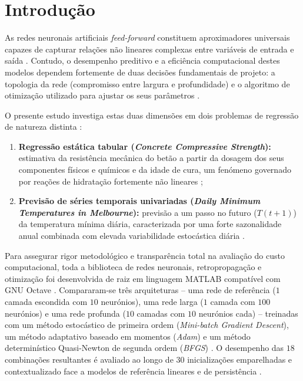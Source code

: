\documentclass[conference]{IEEEtran}
\begin{document}
\section{Introdução}

As redes neuronais artificiais \textit{feed-forward} constituem aproximadores universais capazes de capturar relações não lineares complexas entre variáveis de entrada e saída \cite{b6}. Contudo, o desempenho preditivo e a eficiência computacional destes modelos dependem fortemente de duas decisões fundamentais de projeto: a topologia da rede (compromisso entre largura e profundidade) e o algoritmo de otimização utilizado para ajustar os seus parâmetros \cite{b1, b7}.

O presente estudo investiga estas duas dimensões em dois problemas de regressão de natureza distinta \cite{b1}:
\begin{enumerate}
    \item \textbf{Regressão estática tabular (\textit{Concrete Compressive Strength}):} estimativa da resistência mecânica do betão a partir da dosagem dos seus componentes físicos e químicos e da idade de cura, um fenómeno governado por reações de hidratação fortemente não lineares \cite{b2, b3, b11};
    \item \textbf{Previsão de séries temporais univariadas (\textit{Daily Minimum Temperatures in Melbourne}):} previsão a um passo no futuro ($T(t+1)$) da temperatura mínima diária, caracterizada por uma forte sazonalidade anual combinada com elevada variabilidade estocástica diária \cite{b4, b10}.
\end{enumerate}

Para assegurar rigor metodológico e transparência total na avaliação do custo computacional, toda a biblioteca de redes neuronais, retropropagação \cite{b7} e otimização foi desenvolvida de raiz em linguagem MATLAB compatível com GNU Octave \cite{b1}. Compararam-se três arquiteturas -- uma rede de referência ($1$ camada escondida com $10$ neurónios), uma rede larga ($1$ camada com $100$ neurónios) e uma rede profunda ($10$ camadas com $10$ neurónios cada) -- treinadas com um método estocástico de primeira ordem (\textit{Mini-batch Gradient Descent}), um método adaptativo baseado em momentos (\textit{Adam}) \cite{b5} e um método determinístico Quasi-Newton de segunda ordem (\textit{BFGS}) \cite{b9}. O desempenho das $18$ combinações resultantes é avaliado ao longo de $30$ inicializações emparelhadas e contextualizado face a modelos de referência lineares e de persistência \cite{b1, b10}.
\end{document}
